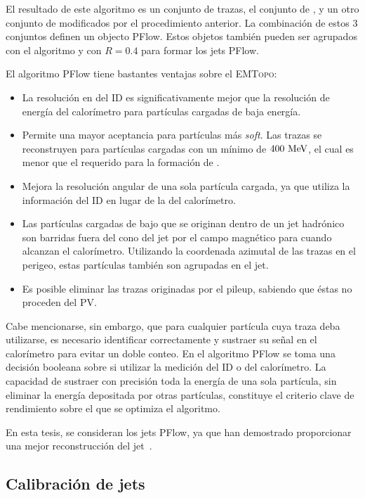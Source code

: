 El resultado de este algoritmo es un conjunto de trazas, el conjunto de \topos, y un otro conjunto de \topos modificados por el procedimiento anterior. La combinaci\'on de estos 3 conjuntos definen un objecto \ac{PFlow}. Estos objetos también pueden ser agrupados con el algoritmo \antikt y con \(R=0.4\) para formar los jets \ac{PFlow}.

El algoritmo \ac{PFlow} tiene bastantes ventajas sobre el \textsc{EMTopo}:
\begin{itemize}
    \item La resolución en \pt del \ac{ID} es significativamente mejor que la resolución de energía del calorímetro para partículas cargadas de baja energía.
    \item Permite una mayor aceptancia para partículas más \textit{soft}. Las trazas se reconstruyen para partículas cargadas con un mínimo \pt de \(400~\text{MeV}\), el cual es menor que el requerido para la formaci\'on de \topos.
    \item Mejora la resolución angular de una sola partícula cargada, ya que utiliza la información del \ac{ID} en lugar de la del calorímetro.
    \item Las partículas cargadas de bajo \pt que se originan dentro de un jet hadrónico son barridas fuera del cono del jet por el campo magnético para cuando alcanzan el calorímetro. Utilizando la coordenada azimutal de las trazas en el perigeo, estas partículas tambi\'en son agrupadas en el jet.
    \item Es posible eliminar las trazas originadas por el pileup, sabiendo que éstas no proceden del \ac{PV}.
\end{itemize}

Cabe mencionarse, sin embargo, que para cualquier partícula cuya traza deba utilizarse, es necesario identificar correctamente y sustraer su señal en el calorímetro para evitar un doble conteo. En el algoritmo \ac{PFlow} se toma una decisión booleana sobre si utilizar la medición del \ac{ID} o del calorímetro. La capacidad de sustraer con precisión toda la energía de una sola partícula, sin eliminar la energía depositada por otras partículas, constituye el criterio clave de rendimiento sobre el que se optimiza el algoritmo.

En esta tesis, se consideran los jets \ac{PFlow}, ya que han demostrado proporcionar una mejor reconstrucción del jet~\cite{ATLAS-JetPFlow-Performance}.


\subsection{Calibraci\'on de jets}

